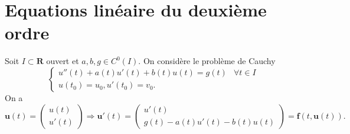 \section{Equations linéaire du deuxième ordre}

Soit $I\subset \mathbf{R}$ ouvert et $a,b,g\in C^{0}(I)$. On considère le problème de Cauchy
$$
\begin{cases}
u''(t)+a(t)u'(t)+b(t)u(t)=g(t) & \forall t\in I \\
u(t_{0})=u_{0}, u'(t_{0})=v_{0}.
\end{cases}
$$
On a
$$
\boldsymbol{u}(t)=\begin{pmatrix}
u(t) \\
u'(t)
\end{pmatrix}\Rightarrow \boldsymbol{u}'(t)=\begin{pmatrix}
u'(t) \\
g(t)-a(t)u'(t)-b(t)u(t)
\end{pmatrix}=\boldsymbol{f}(t,\boldsymbol{u}(t)).
$$